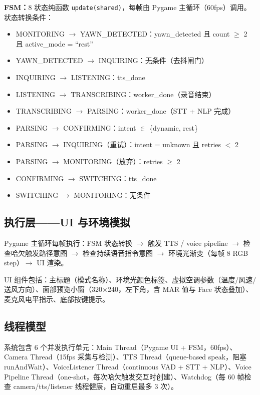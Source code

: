 \documentclass[12pt,a4paper]{ctexart}
\begin{document}
\textbf{FSM：}8 状态纯函数 \texttt{update(shared)}，每帧由 Pygame 主循环（60fps）调用。状态转换条件：

\begin{itemize}
    \item MONITORING $\rightarrow$ YAWN\_DETECTED：yawn\_detected 且 count $\geq$ 2 且 active\_mode = “rest”
    \item YAWN\_DETECTED $\rightarrow$ INQUIRING：无条件（去抖闸门）
    \item INQUIRING $\rightarrow$ LISTENING：tts\_done
    \item LISTENING $\rightarrow$ TRANSCRIBING：worker\_done（录音结束）
    \item TRANSCRIBING $\rightarrow$ PARSING：worker\_done（STT + NLP 完成）
    \item PARSING $\rightarrow$ CONFIRMING：intent $\in$ \{dynamic, rest\}
    \item PARSING $\rightarrow$ INQUIRING（重试）：intent = unknown 且 retries $<$ 2
    \item PARSING $\rightarrow$ MONITORING（放弃）：retries $\geq$ 2
    \item CONFIRMING $\rightarrow$ SWITCHING：tts\_done
    \item SWITCHING $\rightarrow$ MONITORING：无条件
\end{itemize}

\subsection{执行层——UI 与环境模拟}

Pygame 主循环每帧执行：FSM 状态转换 $\rightarrow$ 触发 TTS / voice pipeline $\rightarrow$ 检查哈欠触发路径意图 $\rightarrow$ 检查持续语音指令意图 $\rightarrow$ 环境光渐变（每帧 8 RGB step）$\rightarrow$ UI 渲染。

UI 组件包括：主标题（模式名称）、环境光颜色标签、虚拟空调参数（温度/风速/送风方向）、面部预览小窗（320$\times$240，左下角，含 MAR 值与 Face 状态叠加）、麦克风电平指示、底部按键提示。

\subsection{线程模型}

系统包含 6 个并发执行单元：Main Thread（Pygame UI + FSM，60fps）、Camera Thread（15fps 采集与检测）、TTS Thread（queue-based speak，阻塞 runAndWait）、VoiceListener Thread（continuous VAD + STT + NLP）、Voice Pipeline Thread（one-shot，每次哈欠触发交互时创建）、Watchdog（每 60 帧检查 camera/tts/listener 线程健康，自动重启最多 3 次）。
\end{document}
